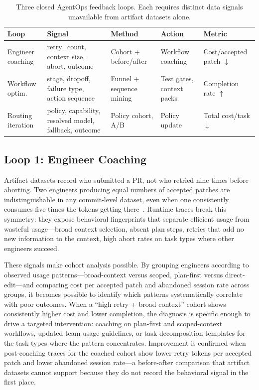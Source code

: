 \documentclass[sigconf,anonymous,review]{acmart}
\begin{document}
\begin{table}[t]
\caption{Three closed AgentOps feedback loops. Each requires distinct
  data signals unavailable from artifact datasets alone.}
\label{tab:loops}
\small
\begin{tabular}{@{}p{1.05cm}p{1.6cm}p{1.35cm}p{1.15cm}p{1.1cm}@{}}
\toprule
\textbf{Loop} & \textbf{Signal} & \textbf{Method} & \textbf{Action} & \textbf{Metric} \\
\midrule
Engineer coaching
  & retry\_count, context size, abort, outcome
  & Cohort + before/after
  & Workflow coaching
  & Cost/accepted patch $\downarrow$ \\
\midrule
Workflow optim.
  & stage, dropoff, failure type, action sequence
  & Funnel + sequence mining
  & Test gates, context packs
  & Completion rate $\uparrow$ \\
\midrule
Routing iteration
  & policy, capability, resolved model, fallback, outcome
  & Policy cohort, A/B
  & Policy update
  & Total cost/task $\downarrow$ \\
\bottomrule
\end{tabular}
\end{table}

\subsection{Loop 1: Engineer Coaching}

Artifact datasets record who submitted a PR, not who retried nine
times before aborting. Two engineers producing equal numbers of
accepted patches are indistinguishable in any commit-level dataset,
even when one consistently consumes five times the tokens getting
there~\cite{agentlens2026, mehtiyev2026beyond}. Runtime traces break
this symmetry: they expose behavioral fingerprints that separate
efficient usage from wasteful usage---broad context selection, absent
plan steps, retries that add no new information to the context,
high abort rates on task types where other engineers succeed.

These signals make cohort analysis possible. By grouping engineers
according to observed usage patterns---broad-context versus scoped,
plan-first versus direct-edit---and comparing cost per accepted
patch and abandoned session rate across groups, it becomes possible
to identify which patterns systematically correlate with poor
outcomes. When a ``high retry + broad context'' cohort shows
consistently higher cost and lower completion, the diagnosis is
specific enough to drive a targeted intervention: coaching on
plan-first and scoped-context workflows, updated team usage
guidelines, or task decomposition templates for the task types
where the pattern concentrates. Improvement is confirmed when
post-coaching traces for the coached cohort show lower retry tokens
per accepted patch and lower abandoned session rate---a before-after
comparison that artifact datasets cannot support because they do not
record the behavioral signal in the first place.
\end{document}
